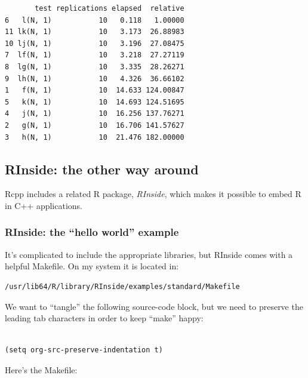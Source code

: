 \documentclass[11pt]{article}
\begin{document}
\begin{verbatim}
       test replications elapsed  relative
6   l(N, 1)           10   0.118   1.00000
11 lk(N, 1)           10   3.173  26.88983
10 lj(N, 1)           10   3.196  27.08475
7  lf(N, 1)           10   3.218  27.27119
8  lg(N, 1)           10   3.335  28.26271
9  lh(N, 1)           10   4.326  36.66102
1   f(N, 1)           10  14.633 124.00847
5   k(N, 1)           10  14.693 124.51695
4   j(N, 1)           10  16.256 137.76271
2   g(N, 1)           10  16.706 141.57627
3   h(N, 1)           10  21.476 182.00000
\end{verbatim}
\subsection{RInside: the other way around}
\label{sec-3-2}


Rcpp includes a related R package, \emph{RInside}, which makes it possible
to embed R in C++ applications.
\subsubsection{RInside: the ``hello world'' example}
\label{sec-3-2-1}


It's complicated to include the appropriate libraries, but RInside
comes with a helpful Makefile.  On my system it is located in:


\begin{verbatim}
/usr/lib64/R/library/RInside/examples/standard/Makefile
\end{verbatim}

We want to ``tangle'' the following source-code block, but we need to
preserve the leading tab characters in order to keep ``make'' happy:


\begin{verbatim}

(setq org-src-preserve-indentation t)
\end{verbatim}

Here's the Makefile:
\end{document}
